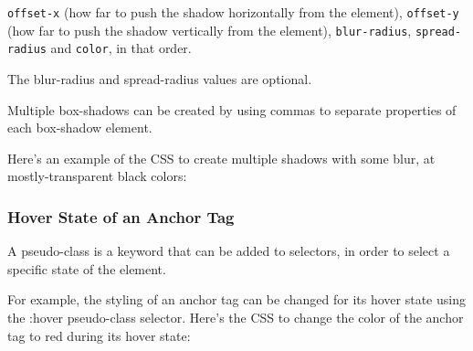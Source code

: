     \texttt{offset-x} (how far to push the shadow horizontally from the element),
    \texttt{offset-y} (how far to push the shadow vertically from the element),
    \texttt{blur-radius},
    \texttt{spread-radius} and
    \texttt{color}, in that order.

The blur-radius and spread-radius values are optional.

Multiple box-shadows can be created by using commas to separate properties of each box-shadow element.

Here's an example of the CSS to create multiple shadows with some blur, at mostly-transparent black colors:


\subsubsection{Hover State of an Anchor Tag}
A pseudo-class is a keyword that can be added to selectors, in order to select a specific state of the element.

For example, the styling of an anchor tag can be changed for its hover state using the :hover pseudo-class selector. Here's the CSS to change the color of the anchor tag to red during its hover state:

